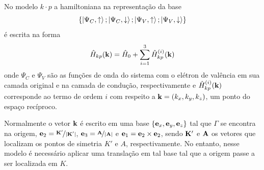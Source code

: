 No modelo $ k \cdot p $ a hamiltoniana na representação da base
\begin{equation}
  \left\{ \ket{\Psi_C,\uparrow} ; \ket{\Psi_C,\downarrow} ; \ket{\Psi_V,\uparrow} ; \ket{\Psi_V,\downarrow} \right\}
  \label{eq:basis}
\end{equation}
é escrita na forma
\begin{equation}
  \hat{H}_{kp}(\mathbf{k}) = \hat{H}_0 + \sum_{i=1}^3 \hat{H}_{kp}^{(i)}(\mathbf{k})
  \label{eq:total_ham}
\end{equation}
onde $ \Psi_C $ e $ \Psi_V $ são as funções de onda do sistema com o elétron de
valência em sua camada original e na camada de condução, respectivamente e 
$ \hat{H}_{kp}^{(i)}(\mathbf{k}) $ corresponde ao termo de ordem $ i $ com respeito
a $ \mathbf{k} = (k_x, k_y, k_z) $, um ponto do espaço recíproco. 

Normalmente o vetor $ \mathbf{k} $ é escrito em uma base $ \{\mathbf{e}_x,\mathbf{e}_y,\mathbf{e}_z\} $
tal que $\Gamma$ se encontra na origem,
$ \mathbf{e}_2 = \nicefrac{\mathbf{K}'}{|\mathbf{K}'|} $, 
$ \mathbf{e}_3 = \nicefrac{\mathbf{A}}{|\mathbf{A}|} $ e 
$ \mathbf{e}_1 = \mathbf{e}_2 \times \mathbf{e}_2 $, sendo 
$ \mathbf{K}' $ e $ \mathbf{A} $ os vetores que localizam os pontos de simetria $K'$ e $A$, respectivamente.
No entanto, nesse modelo é necessário aplicar uma translação em tal base tal que
a origem passe a ser localizada em $K$.

